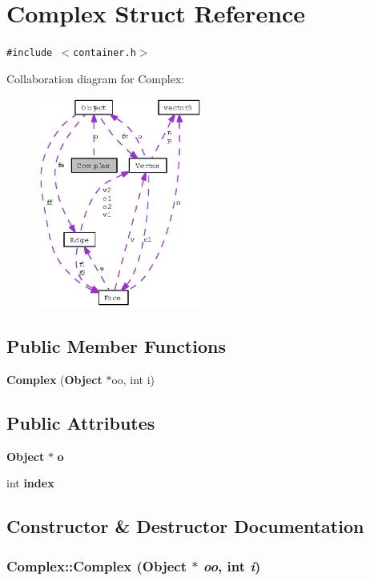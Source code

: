 \section{Complex Struct Reference}
\label{structComplex}
{\tt \#include $<$container.h$>$}

Collaboration diagram for Complex:\begin{figure}[H]
\begin{center}
\leavevmode
\includegraphics[width=153pt]{structComplex__coll__graph}
\end{center}
\end{figure}
\subsection*{Public Member Functions}
\begin{CompactItemize}
\item 
{\bf Complex} ({\bf Object} $\ast$oo, int i)
\end{CompactItemize}
\subsection*{Public Attributes}
\begin{CompactItemize}
\item 
{\bf Object} $\ast$ {\bf o}
\item 
int {\bf index}
\end{CompactItemize}


\subsection{Constructor \& Destructor Documentation}
\subsubsection{\setlength{\rightskip}{0pt plus 5cm}Complex::Complex ({\bf Object} $\ast$ {\em oo}, int {\em i})\hspace{0.3cm}{\tt  [inline]}}\label{structComplex_c7f33e27fa07f516f3584c40531a0818}




